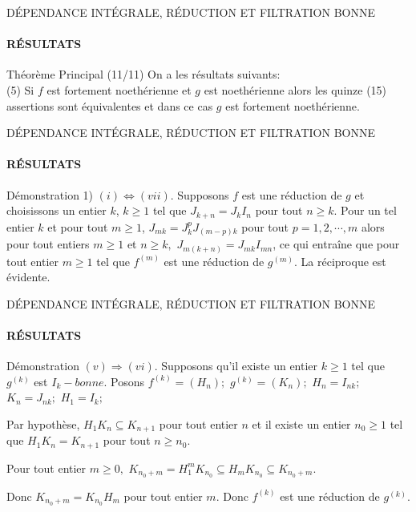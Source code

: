 \documentclass[11pt,a4paper]{beamer}
\begin{document}
\begin{frame}{DÉPENDANCE INTÉGRALE, RÉDUCTION ET FILTRATION BONNE}
	\framesubtitle{RÉSULTATS}
	\begin{block}{Théorème Principal (11/11)}
		On a les résultats suivants:\\
		(5) Si $f$ est fortement noethérienne et $g$ est noethérienne alors les quinze (15) assertions sont équivalentes et dans ce cas $g$ est fortement noethérienne.
	\end{block}
\end{frame}

\begin{frame}{DÉPENDANCE INTÉGRALE, RÉDUCTION ET FILTRATION BONNE}
	\framesubtitle{RÉSULTATS}
	\begin{block}{Démonstration}
			1)
		$(i)\Longleftrightarrow (vii).$
		Supposons $f$ est une réduction de $g$ et choisissons un entier $k$, $k \geqslant 1$ tel que $J_{k+n}  = J_{k}I_n$ pour tout $n \geqslant k$. Pour un tel entier $k$ et pour tout $m \geqslant 1$, $J_{mk}=J_{k}^{p}J_{(m-p)k}
		$ pour tout $p=1,2,\cdots,m$ alors pour tout
		entiers $m\geq 1$ et $n\geq k,$ $J_{m(k+n)}=J_{mk}I_{mn}$, ce qui entraîne que pour tout entier $m\geq 1$ tel que $f^{(m)}$ est une réduction de $g^{(m)}.$
		La réciproque est évidente.
	\end{block}
\end{frame}

\begin{frame}{DÉPENDANCE INTÉGRALE, RÉDUCTION ET FILTRATION BONNE}
	\framesubtitle{RÉSULTATS}
	\begin{block}{Démonstration}
		$(v)\Longrightarrow (vi).$
		Supposons qu'il existe un entier $k\geq 1$ tel que $g^{(k)}$ est $I_{k}-bonne$.
		Posons $f^{(k)}=(H_{n});$ $g^{(k)}=(K_{n});$ $H_{n}=I_{nk};$ $K_{n}=J_{nk};$ 
		$H_{1}=I_{k};$
		
		Par hypothèse, $H_{1}K_{n}\subseteq K_{n+1}$ pour tout entier $n$ et il
		existe un entier $n_{0}\geq 1$ tel que $H_{1}K_{n}=K_{n+1}$ pour tout $n\geq
		n_{0}.$
		
		Pour tout entier $m\geq 0,$ $K_{n_{0}+m}=H_{1}^{m}K_{n_{0}}\subseteq
		H_{m}K_{n_{0}}\subseteq K_{n_{0}+m}.$
		
		Donc $K_{n_{0}+m}=K_{n_{0}}H_{m}$ pour tout entier $m.$ Donc $f^{(k)}$
		est une réduction de $g^{(k)}.$
		
	\end{block}
\end{frame}
\end{document}
